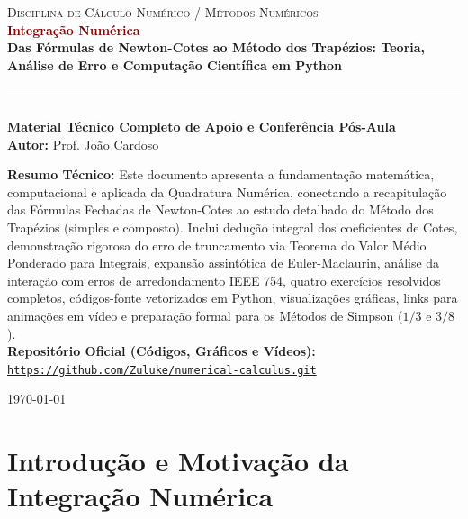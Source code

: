 \documentclass[11pt,a4paper]{article}
\begin{document}
\begin{titlepage}
    \centering
    \vspace*{1.5cm}
    {\large \textsc{Disciplina de Cálculo Numérico / Métodos Numéricos}}\\[1.2cm]
    {\Huge \bfseries \textcolor{darkred}{Integração Numérica}}\\[0.5cm]
    {\LARGE \bfseries Das Fórmulas de Newton-Cotes ao Método dos Trapézios: Teoria, Análise de Erro e Computação Científica em Python}\\[1.4cm]
    \rule{0.75\textwidth}{1.5pt}\\[0.8cm]
    {\large \textbf{Material Técnico Completo de Apoio e Conferência Pós-Aula}}\\[0.4cm]
    {\large \textbf{Autor:} Prof. João Cardoso}\\[1.2cm]
    \begin{tcolorbox}[colback=backcolour, colframe=primary, width=0.88\textwidth, arc=2mm]
        \small
        \textbf{Resumo Técnico:} Este documento apresenta a fundamentação matemática, computacional e aplicada da Quadratura Numérica, conectando a recapitulação das Fórmulas Fechadas de Newton-Cotes ao estudo detalhado do Método dos Trapézios (simples e composto). Inclui dedução integral dos coeficientes de Cotes, demonstração rigorosa do erro de truncamento via Teorema do Valor Médio Ponderado para Integrais, expansão assintótica de Euler-Maclaurin, análise da interação com erros de arredondamento IEEE 754, quatro exercícios resolvidos completos, códigos-fonte vetorizados em Python, visualizações gráficas, links para animações em vídeo e preparação formal para os Métodos de Simpson ($1/3$ e $3/8$).\\[0.4em]
        \textbf{Repositório Oficial (Códigos, Gráficos e Vídeos):}\\
        \href{https://github.com/Zuluke/numerical-calculus.git}{\nolinkurl{https://github.com/Zuluke/numerical-calculus.git}}
    \end{tcolorbox}
    \vfill
    {\normalsize \today}
\end{titlepage}

\tableofcontents
\newpage

\section{Introdução e Motivação da Integração Numérica}
\end{document}

